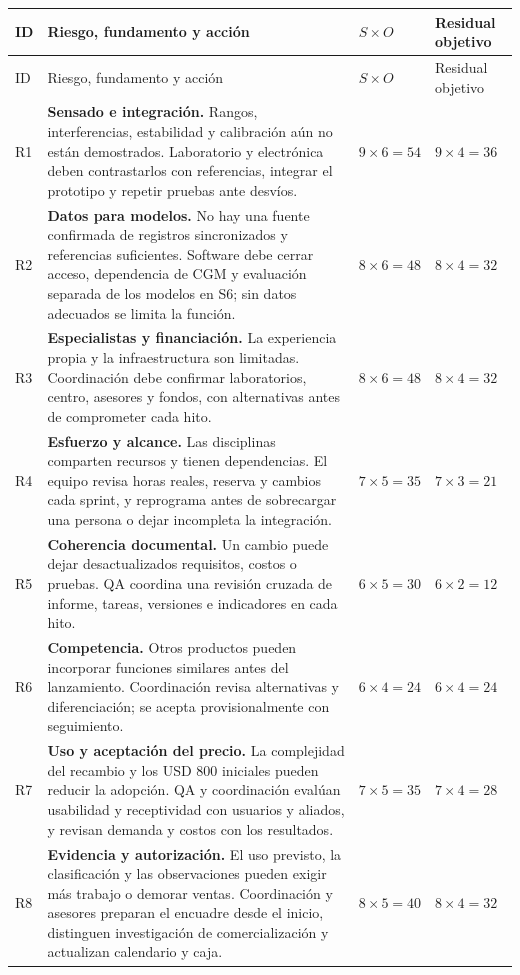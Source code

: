 {\small\renewcommand{\arraystretch}{1.2}
\begin{xltabular}{\linewidth}{l X l l}\toprule
ID & Riesgo, fundamento y acción & $S\times O$ & Residual objetivo\\\midrule
\endfirsthead
\toprule ID & Riesgo, fundamento y acción & $S\times O$ & Residual objetivo\\\midrule\endhead
R1 & \textbf{Sensado e integración.} Rangos, interferencias, estabilidad y calibración aún no están demostrados. Laboratorio y electrónica deben contrastarlos con referencias, integrar el prototipo y repetir pruebas ante desvíos. & $9\times6=54$ & $9\times4=36$\\
R2 & \textbf{Datos para modelos.} No hay una fuente confirmada de registros sincronizados y referencias suficientes. Software debe cerrar acceso, dependencia de CGM y evaluación separada de los modelos en S6; sin datos adecuados se limita la función. & $8\times6=48$ & $8\times4=32$\\
R3 & \textbf{Especialistas y financiación.} La experiencia propia y la infraestructura son limitadas. Coordinación debe confirmar laboratorios, centro, asesores y fondos, con alternativas antes de comprometer cada hito. & $8\times6=48$ & $8\times4=32$\\
R4 & \textbf{Esfuerzo y alcance.} Las disciplinas comparten recursos y tienen dependencias. El equipo revisa horas reales, reserva y cambios cada sprint, y reprograma antes de sobrecargar una persona o dejar incompleta la integración. & $7\times5=35$ & $7\times3=21$\\
R5 & \textbf{Coherencia documental.} Un cambio puede dejar desactualizados requisitos, costos o pruebas. QA coordina una revisión cruzada de informe, tareas, versiones e indicadores en cada hito. & $6\times5=30$ & $6\times2=12$\\
R6 & \textbf{Competencia.} Otros productos pueden incorporar funciones similares antes del lanzamiento. Coordinación revisa alternativas y diferenciación; se acepta provisionalmente con seguimiento. & $6\times4=24$ & $6\times4=24$\\
R7 & \textbf{Uso y aceptación del precio.} La complejidad del recambio y los USD 800 iniciales pueden reducir la adopción. QA y coordinación evalúan usabilidad y receptividad con usuarios y aliados, y revisan demanda y costos con los resultados. & $7\times5=35$ & $7\times4=28$\\
R8 & \textbf{Evidencia y autorización.} El uso previsto, la clasificación y las observaciones pueden exigir más trabajo o demorar ventas. Coordinación y asesores preparan el encuadre desde el inicio, distinguen investigación de comercialización y actualizan calendario y caja. & $8\times5=40$ & $8\times4=32$\\
\bottomrule\end{xltabular}}


